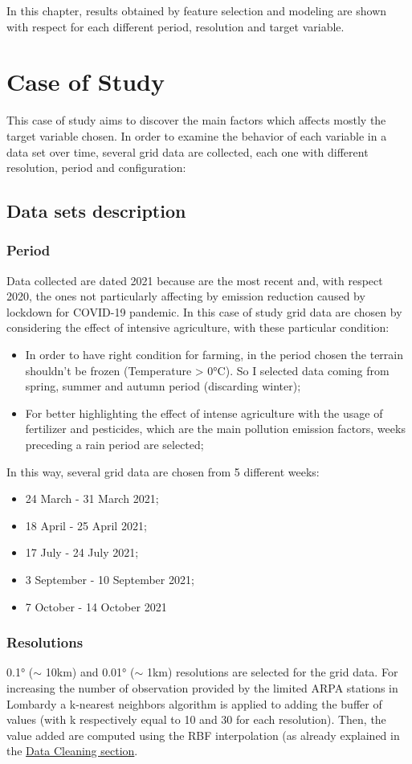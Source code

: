 In this chapter, results obtained by feature selection and modeling are shown with respect for each different period, resolution and target variable. 

\section{Case of Study}
This case of study aims to discover the main factors which affects mostly the target variable chosen. In order to examine the behavior of each variable in a data set over time, several grid data are collected, each one with different resolution, period and configuration:
\subsection{Data sets description}
\subsubsection{Period}  
Data collected are dated 2021 because are the most recent and, with respect 2020, the ones not particularly affecting by emission reduction caused by lockdown for COVID-19 pandemic\cite{bontempi2022analysis}. In this case of study grid data are chosen by considering the effect of intensive agriculture, with these particular condition:
    \begin{itemize}
        \item In order to have right condition for farming, in the period chosen the terrain shouldn't be frozen (Temperature > 0°C). So I selected data coming from spring, summer and autumn period (discarding winter);
        \item For better highlighting the effect of intense agriculture with the usage of fertilizer and pesticides, which are the main pollution emission factors, weeks preceding a rain period are selected;
\end{itemize}
In this way, several grid data are chosen from 5 different weeks:
\begin{itemize}
    \item 24 March - 31 March 2021;
    \item 18 April - 25 April 2021;
    \item 17 July - 24 July 2021;
    \item 3 September - 10 September 2021;
    \item 7 October - 14 October 2021
\end{itemize}
\subsubsection{Resolutions}
0.1° ($\sim$ 10km) and 0.01° ($\sim$ 1km) resolutions are selected for the grid data. For increasing the number of observation provided by the limited ARPA stations in Lombardy a k-nearest neighbors algorithm is applied to adding the buffer of values (with k respectively equal to 10 and 30 for each resolution). Then, the value added are computed using the RBF interpolation (as already explained in the \hyperref[sec:Data cleaning]{Data Cleaning section}.

